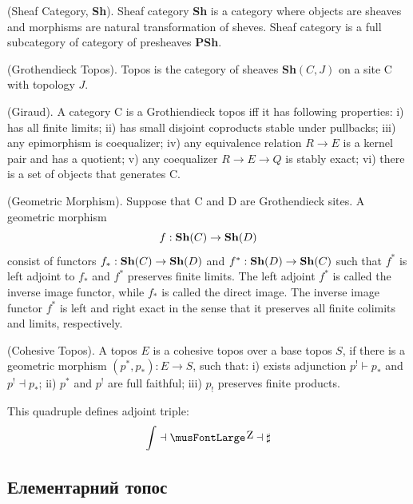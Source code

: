 \begin{definition}
\begin{definition} (Sheaf Category, {\bf Sh}).
Sheaf category {\bf Sh}
is a category where objects are sheaves and morphisms are
natural transformation of sheves. Sheaf category is a full subcategory
of category of presheaves {\bf PSh}.
\end{definition}

\begin{definition} (Grothendieck Topos).
Topos is the category of sheaves {\bf Sh}$(C,J)$ on a site $\mathrm{C}$ with topology $J$.
\end{definition}

\begin{theorem} (Giraud).
A category $\mathrm{C}$ is a Grothiendieck topos iff it has following properties:
i) has all finite limits;
ii) has small disjoint coproducts stable under pullbacks;
iii) any epimorphism is coequalizer;
iv) any equivalence relation $R \rightarrow E$ is a kernel pair and has a quotient;
v) any coequalizer $R \rightarrow E \rightarrow Q$ is stably exact;
vi) there is a set of objects that generates $\mathrm{C}$.
\end{theorem}

\begin{definition} (Geometric Morphism). Suppose that $\mathrm{C}$ and $\mathrm{D}$
are Grothendieck sites. A geometric morphism
$$
    f : {\bf Sh}(C) \rightarrow {\bf Sh}(D)
$$
consist of functors $f_* : {\bf Sh}(C) \rightarrow {\bf Sh}(D)$ and
$f^* : {\bf Sh}(D) \rightarrow {\bf Sh}(C)$ such that $f^*$ is
left adjoint to $f_*$ and $f^*$ preserves finite limits. The left adjoint $f^*$ is called
the inverse image functor, while $f_*$ is called the direct image. The inverse image functor
$f^*$ is left and right exact in the sense that it preserves all finite
colimits and limits, respectively.
\end{definition}

\begin{definition} (Cohesive Topos). A topos $E$ is a cohesive topos over a base topos $S$,
if there is a geometric morphism $(p^*,p_*): E \rightarrow S$, such that:
i) exists adjunction $p^! \vdash p_*$ and $ p^! \dashv p_*$;
ii) $p^*$ and $p^!$ are full faithful; iii) $p_!$ preserves finite products.
\end{definition}
This quadruple defines adjoint triple:
$$
\int \dashv \fl \dashv \sharp
$$

\subsection{Елементарний топос}


\end{definition}
